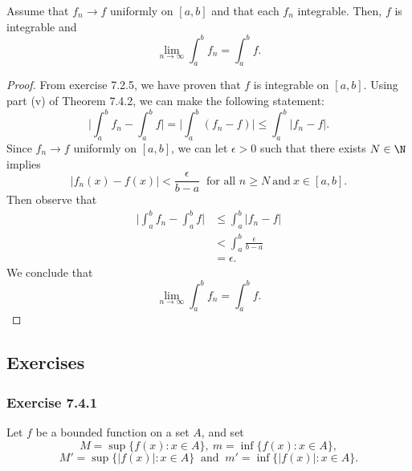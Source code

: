 \begin{tcolorbox}
	\begin{thm}
	Assume that \( f_{n} \to f  \) uniformly on \( [a,b]  \) and that each \( f_{n}  \) integrable. Then, \( f \) is integrable and 
	\[  \lim_{ n \to \infty  }  \int_{ a }^{ b } f_{n} = \int_{ a }^{ b } f. \]
	\end{thm}
\end{tcolorbox}
\begin{proof} From exercise 7.2.5, we have proven that \( f  \) is integrable on \( [a,b] \). 
	Using part (v) of Theorem 7.4.2, we can make the following statement:
	\[ \Big| \int_{ a }^{ b } f_{n} - \int_{ a }^{ b } f  \Big| = \Big| \int_{ a }^{ b }  (f_{n} - f )  \Big| \leq \int_{ a }^{ b }  | f_{n} -f  |.   \]
	Since \( f_{n} \to f  \) uniformly on \( [a,b] \), we can let \( \epsilon > 0  \) such that there exists \( N \in \N \) implies 
	\[  | f_{n}(x) - f(x)  | < \frac{ \epsilon  }{ b -a  }  \ \text{ for all } n \geq N \ \text{and} \ x \in [a,b].\] Then observe that 
	\begin{align*}
	    \Big| \int_{ a }^{ b } f_{n} - \int_{ a }^{ b } f  \Big| &\leq \int_{ a }^{ b } | f_{n} - f  |   \\
																 &< \int_{ a }^{ b }  \frac{ \epsilon  }{ b -a  } \\
																 &= \epsilon.
	\end{align*}
	We conclude that 
	\[  \lim_{ n \to \infty  }  \int_{ a }^{ b } f_{n} = \int_{ a }^{ b } f. \]
\end{proof}

\subsection{Exercises}

\subsubsection{Exercise 7.4.1} Let \( f  \) be a bounded function on a set \( A  \), and set 
\[  M = \sup \{ f(x) : x \in A  \},  \ m = \inf \{ f(x) : x \in A \}, \]
\[  M' = \sup \{ | f(x)  | : x \in A  \} \ \text{ and } \ m' = \inf \{ | f(x)  | : x \in A \}. \]

